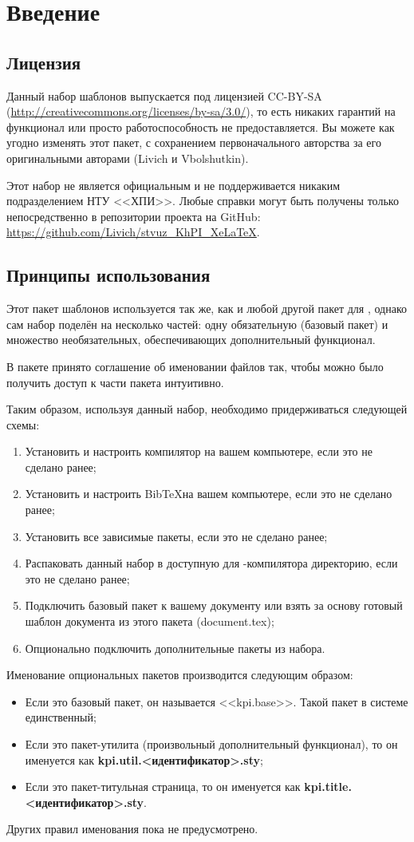 \section{Введение}
\subsection{Лицензия}
	Данный набор шаблонов выпускается под лицензией CC-BY-SA
	(\url{http://creativecommons.org/licenses/by-sa/3.0/}), то есть никаких
	гарантий на функционал или просто работоспособность не предоставляется. Вы
	можете как угодно изменять этот пакет, с сохранением первоначального авторства
	за его оригинальными авторами (Livich и Vbolshutkin).\par
	Этот набор не является официальным и не поддерживается никаким подразделением
	НТУ <<ХПИ>>. Любые справки могут быть получены только непосредственно в
	репозитории проекта на GitHub:
	\url{https://github.com/Livich/stvuz_KhPI_XeLaTeX}.
\subsection{Принципы использования}
	Этот пакет шаблонов используется так же, как и любой другой пакет для \XeLaTeX,
	однако сам набор поделён на несколько частей: одну обязательную (базовый пакет)
	и множество необязательных, обеспечивающих дополнительный функционал.\par
	В пакете принято соглашение об именовании файлов так, чтобы можно было получить
	доступ к части пакета интуитивно.\par
	Таким образом, используя данный набор, необходимо придерживаться следующей
	схемы:
	\begin{enumerate}
	  \item Установить и настроить компилятор \XeLaTeX на вашем компьютере, если
	  это не сделано ранее;
	  \item Установить и настроить Bib\TeX на вашем компьютере, если
	  это не сделано ранее;
	  \item Установить все зависимые пакеты, если
	  это не сделано ранее;
	  \item Распаковать данный набор в доступную для \XeLaTeX-компилятора
	  директорию, если это не сделано ранее;
	  \item Подключить базовый пакет к вашему документу или взять за основу готовый
	  шаблон документа из этого пакета (document.tex);
	  \item Опционально подключить дополнительные пакеты из набора.
	\end{enumerate}
	Именование опциональных пакетов производится следующим образом:
	\begin{itemize}
	  \item Если это базовый пакет, он называется <<kpi.base>>. Такой пакет в системе единственный;
	  \item Если это пакет-утилита (произвольный дополнительный функционал), то он
	  именуется как {\bf kpi.util.<идентификатор>.sty};
	  \item Если это пакет-титульная страница, то он именуется как {\bf
	  kpi.title.<идентификатор>.sty}.
	\end{itemize}
	Других правил именования пока не предусмотрено.
